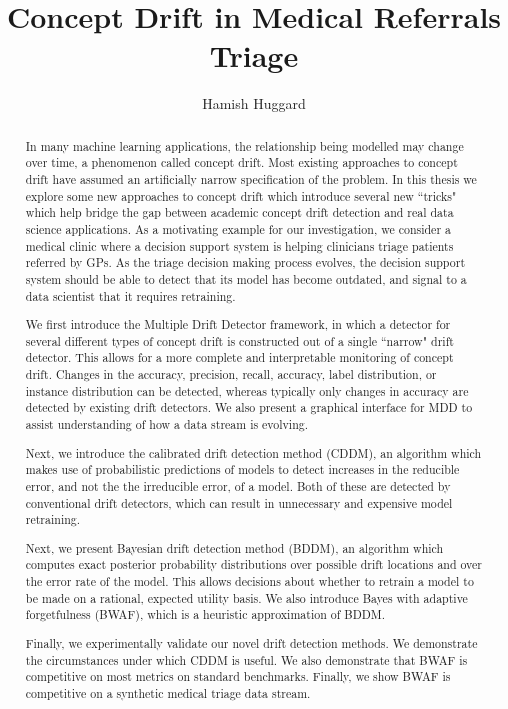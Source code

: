 \documentclass[12pt,examcopy]{uathesis}
\begin{document}
\title{Concept Drift in Medical Referrals Triage}
\author{Hamish Huggard}
\maketitle

\frontmatter
\begin{abstract}
In many machine learning applications, the relationship being modelled may change over time, a phenomenon called concept drift. Most existing approaches to concept drift have assumed an artificially narrow specification of the problem. In this thesis we explore some new approaches to concept drift which introduce several new ``tricks" which help bridge the gap between academic concept drift detection and real data science applications. As a motivating example for our investigation, we consider a medical clinic where a decision support system is helping clinicians triage patients referred by GPs. As the triage decision making process evolves, the decision support system should be able to detect that its model has become outdated, and signal to a data scientist that it requires retraining.

We first introduce the Multiple Drift Detector framework, in which a detector for several different types of concept drift is constructed out of a single ``narrow" drift detector. This allows for a more complete and interpretable monitoring of concept drift. Changes in the accuracy, precision, recall, accuracy, label distribution, or instance distribution can be detected, whereas typically only changes in accuracy are detected by existing drift detectors. We also present a graphical interface for MDD to assist understanding of how a data stream is evolving.

Next, we introduce the calibrated drift detection method (CDDM), an algorithm which makes use of probabilistic predictions of models to detect increases in the reducible error, and not the the irreducible error, of a model. Both of these are detected by conventional drift detectors, which can result in unnecessary and expensive model retraining.

Next, we present Bayesian drift detection method (BDDM), an algorithm which computes exact posterior probability distributions over possible drift locations and over the error rate of the model. This allows decisions about whether to retrain a model to be made on a rational, expected utility basis. We also introduce Bayes with adaptive forgetfulness (BWAF), which is a heuristic approximation of BDDM.

Finally, we experimentally validate our novel drift detection methods. We demonstrate the circumstances under which CDDM is useful. We also demonstrate that BWAF is competitive on most metrics on standard benchmarks. Finally, we show BWAF is competitive on a synthetic medical triage data stream.
\end{abstract}
\end{document}
